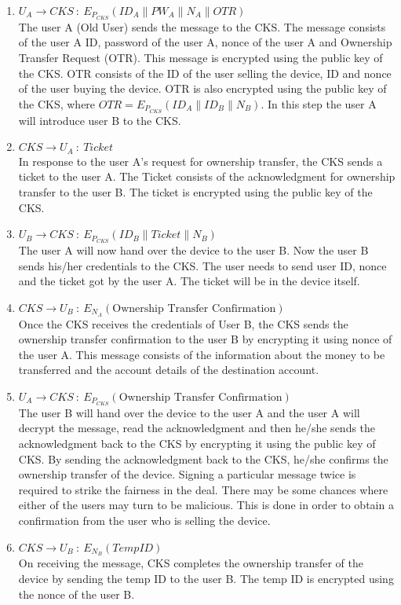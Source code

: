 \documentclass[letterpaper]{article}
\begin{document}
			\begin{enumerate}
				\item $ U_A\rightarrow CKS \ :\ E_{P_{CKS}} (ID_{A} \| PW_A \| N_A\| OTR)$ \\ 
				The user A (Old User) sends the message to the CKS. The message consists of the user A ID, password of the user A, nonce of the user A and Ownership Transfer Request (OTR). This message is encrypted using the public key of the CKS. OTR consists of the ID of the user selling the device, ID and nonce of the user buying the device. OTR is also encrypted using the public key of the CKS, where $OTR = E_{P_{CKS}} (ID_A \| ID_B \| N_B)$. In this step the user A will introduce user B to the CKS.  
				\item  $CKS \rightarrow U_A \ :\ Ticket$\\ 
				In response to the user A's request for ownership transfer, the CKS sends a ticket to the user A. The Ticket consists of the acknowledgment for ownership transfer to the user B. The ticket is encrypted using the public key of the CKS.
				\item $U_B \rightarrow CKS \ :\ E_{P_{CKS}}(ID_{B} \| Ticket \| N_B)$\\ 
				The user A will now hand over the device to the user B. Now the user B sends his/her credentials to the CKS. The user needs to send user ID, nonce and the ticket got by the user A. The ticket will be in the device itself.   
			 \item $CKS \rightarrow U_B \ :\ E_{N_{A}}(\mbox{Ownership Transfer Confirmation})$\\ 
					Once the CKS receives the credentials of User B, the CKS sends the ownership transfer confirmation to the user B by encrypting it using nonce of the user A. This message consists of the information about the money to be transferred and the account details of the destination account. 
				\item $U_A \rightarrow CKS \ :\  E_{P_{CKS}}(\mbox{Ownership Transfer Confirmation})$\\ 
				The user B will hand over the device to the user A and the user A will decrypt the message, read the acknowledgment and then he/she sends the acknowledgment back to the CKS by encrypting it using the public key of CKS. By sending the acknowledgment back to the CKS, he/she confirms the ownership transfer of the device. Signing a particular message twice is required to strike the fairness in the deal. There may be some chances where either of the users may turn to be malicious. This is done in order to obtain a confirmation from the user who is selling the device. 
				\item $CKS \rightarrow U_B \ :\ E_{N_{B}}(TempID)$\\ 
				On receiving the message, CKS completes the ownership transfer of the device by sending the temp ID  to the user B. The temp ID is encrypted using the nonce of the user B. 
								
			\end{enumerate}
	
\end{document}
